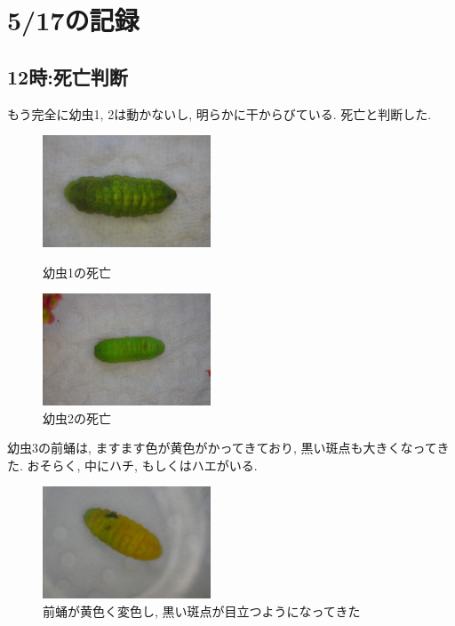 \documentclass{jsarticle}
\begin{document}
\section{5/17の記録}
\subsection{12時:死亡判断}
もう完全に幼虫1, 2は動かないし, 明らかに干からびている. 死亡と判断した.

\begin{figure}[htbp]
  \begin{minipage}{0.5\hsize}
    \begin{center}
      \includegraphics[width=5cm]{photo4/Larva1Dead.JPG}
    \end{center}
    \caption{幼虫1の死亡}
    \label{Larba1Dead}
  \end{minipage}
  \begin{minipage}{0.5\hsize}
    \begin{center}
      \includegraphics[width=5cm]{photo4/Larva2Dead.JPG}
    \end{center}
    \caption{幼虫2の死亡}
    \label{Larba2Dead}
  \end{minipage}
\end{figure}

幼虫3の前蛹は, ますます色が黄色がかってきており, 黒い斑点も大きくなってきた. 
おそらく, 中にハチ, もしくはハエがいる. 

\begin{figure}[htbp]
  \begin{center}
    \includegraphics[width=5cm]{photo4/pupa_parasited.JPG}
  \end{center}
  \caption{前蛹が黄色く変色し, 黒い斑点が目立つようになってきた}
\end{figure}
\end{document}
